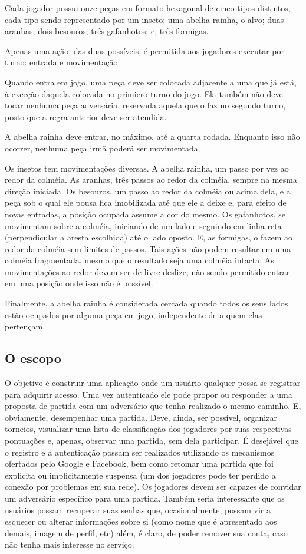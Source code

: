     Cada jogador possui onze peças em formato hexagonal de cinco tipos distintos, cada tipo sendo representado por um inseto: uma abelha rainha, o alvo; duas aranhas; dois besouros; três gafanhotos; e, três formigas.

    Apenas uma ação, das duas possíveis, é permitida aos jogadores executar por turno: entrada e movimentação.

    Quando entra em jogo, uma peça deve ser colocada adjacente a uma que já está, à exceção daquela colocada no primiero turno do jogo. Ela também não deve tocar nenhuma peça adversária, reservada aquela que o faz no segundo turno, posto que a regra anterior deve ser atendida.

    A abelha rainha deve entrar, no máximo, até a quarta rodada. Enquanto isso não ocorrer, nenhuma peça irmã poderá ser movimentada.

    Os insetos tem movimentações diversas. A abelha rainha, um passo por vez ao redor da colméia. As aranhas, três passos ao redor da colméia, sempre na mesma direção iniciada. Os besouros, um passo ao redor da colméia ou acima dela, e a peça sob o qual ele pousa fica imobilizada até que ele a deixe e, para efeito de novas entradas, a posição ocupada assume a cor do mesmo. Os gafanhotos, se movimentam sobre a colméia, iniciando de um lado e seguindo em linha reta (perpendicular a aresta escolhida) até o lado oposto. E,  as formigas, o fazem ao redor da colméia sem limites de passos. Tais ações não podem resultar em uma colméia fragmentada, mesmo que o resultado seja uma colméia intacta. As movimentações ao redor devem ser de livre deslize, não sendo permitido entrar em uma posição onde isso não é possível.

    Finalmente, a abelha rainha é considerada cercada quando todos os seus lados estão ocupados por alguma peça em jogo, independente de a quem elas pertençam.

  \subsection{O escopo}

    O objetivo é construir uma aplicação onde um usuário qualquer possa se registrar para adquirir acesso. Uma vez autenticado ele pode propor ou responder a uma proposta de partida com um adversário que tenha realizado o mesmo caminho. E, obviamente, desempenhar uma partida. Deve, ainda, ser possível, organizar torneios, visualizar uma lista de classificação dos jogadores por suas respectivas pontuações e, apenas, observar uma partida, sem dela participar. É desejável que o registro e a autenticação possam ser realizados utilizando os mecanismos ofertados pelo Google e Facebook, bem como retomar uma partida que foi explicita ou implicitamente suspensa (um dos jogadores pode ter perdido a conexão por problemas em sua rede). Os jogadores devem ser capazes de convidar um adversário específico para uma partida. Também seria interessante que os usuários possam recuperar suas senhas que, ocasionalmente, possam vir a esquecer ou alterar informações sobre si (como nome que é apresentado aos demais, imagem de perfil, etc) além, é claro, de poder remover sua conta, caso não tenha mais interesse no serviço.

